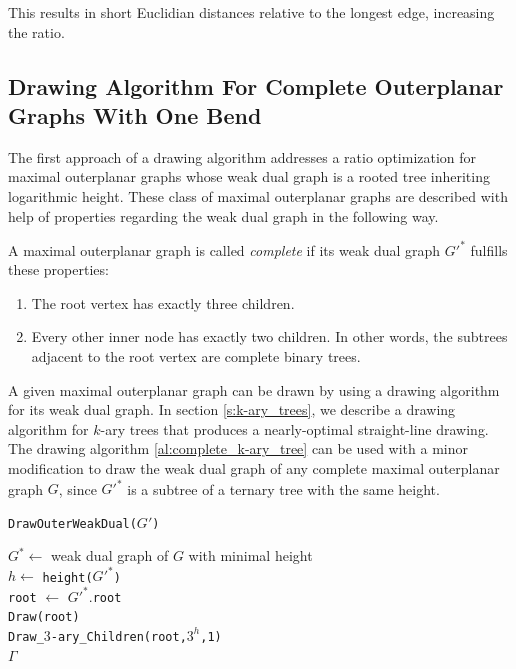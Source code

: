 This results in short Euclidian distances relative to the longest edge, increasing the ratio.
\subsection{Drawing Algorithm For Complete Outerplanar Graphs With One Bend}
The first approach of a drawing algorithm addresses a ratio optimization for maximal outerplanar graphs whose weak dual graph is a rooted tree inheriting logarithmic height. These class of maximal outerplanar graphs are described with help of properties regarding the weak dual graph in the following way.
\begin{definition}\label{def:complete_maximal_outerplanar}
	A maximal outerplanar graph is called \emph{complete} if its weak dual graph $G'^*$ fulfills these properties:
	\begin{enumerate}
		\item The root vertex has exactly three children.
		\item Every other inner node has exactly two children. In other words, the subtrees adjacent to the root vertex are complete binary trees.
	\end{enumerate}
\end{definition}
A given maximal outerplanar graph can be drawn by using a drawing algorithm for its weak dual graph. In section \ref{s:k-ary_trees}, we describe a drawing algorithm for $k$-ary trees that produces a nearly-optimal straight-line drawing. The drawing algorithm \ref{al:complete_k-ary_tree} can be used with a minor modification to draw the weak dual graph of any complete maximal outerplanar graph $G$, since $G'^*$ is a subtree of a ternary tree with the same height.\\

\begin{algorithm}[H]
	\caption{\texttt{DrawOuterWeakDual($G'$)}}\label{al:drawouterweakdual}
	$G^* \gets$ weak dual graph of $G$ with minimal height\\
	$h \gets$ \texttt{height($G'^*$)}\\
	\texttt{root} $\gets$ $G'^*$.\texttt{root}\\
	\texttt{Draw(root)}\\
	\texttt{Draw\_$3$-ary\_Children(\texttt{root},$3^h$,1)}\\
	\Return $\Gamma$
\end{algorithm}

